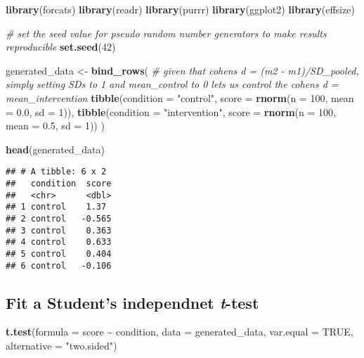 \documentclass[
]{article}
\newenvironment{Shaded}{\begin{snugshade}}{\end{snugshade}}
\newcommand{\AttributeTok}[1]{\textcolor[rgb]{0.13,0.29,0.53}{#1}}
\newcommand{\CommentTok}[1]{\textcolor[rgb]{0.56,0.35,0.01}{\textit{#1}}}
\newcommand{\ConstantTok}[1]{\textcolor[rgb]{0.56,0.35,0.01}{#1}}
\newcommand{\DecValTok}[1]{\textcolor[rgb]{0.00,0.00,0.81}{#1}}
\newcommand{\FloatTok}[1]{\textcolor[rgb]{0.00,0.00,0.81}{#1}}
\newcommand{\FunctionTok}[1]{\textcolor[rgb]{0.13,0.29,0.53}{\textbf{#1}}}
\newcommand{\NormalTok}[1]{#1}
\newcommand{\OtherTok}[1]{\textcolor[rgb]{0.56,0.35,0.01}{#1}}
\newcommand{\SpecialCharTok}[1]{\textcolor[rgb]{0.81,0.36,0.00}{\textbf{#1}}}
\newcommand{\StringTok}[1]{\textcolor[rgb]{0.31,0.60,0.02}{#1}}
\begin{document}
\begin{Shaded}
\begin{Highlighting}[]
\FunctionTok{library}\NormalTok{(forcats)}
\FunctionTok{library}\NormalTok{(readr)}
\FunctionTok{library}\NormalTok{(purrr) }
\FunctionTok{library}\NormalTok{(ggplot2)}
\FunctionTok{library}\NormalTok{(effsize)}

\CommentTok{\# set the seed value for pseudo random number generators to make results reproducible  }
\FunctionTok{set.seed}\NormalTok{(}\DecValTok{42}\NormalTok{)}

\NormalTok{generated\_data }\OtherTok{\textless{}{-}} 
  \FunctionTok{bind\_rows}\NormalTok{(}
    \CommentTok{\# given that cohen\textquotesingle{}s d = (m2 {-} m1)/SD\_pooled, simply setting SDs to 1 and mean\_control to 0 lets us control the cohen\textquotesingle{}s d = mean\_intervention}
    \FunctionTok{tibble}\NormalTok{(}\AttributeTok{condition =} \StringTok{"control"}\NormalTok{,}
           \AttributeTok{score =} \FunctionTok{rnorm}\NormalTok{(}\AttributeTok{n =} \DecValTok{100}\NormalTok{, }\AttributeTok{mean =} \FloatTok{0.0}\NormalTok{, }\AttributeTok{sd =} \DecValTok{1}\NormalTok{)), }
    \FunctionTok{tibble}\NormalTok{(}\AttributeTok{condition =} \StringTok{"intervention"}\NormalTok{,}
           \AttributeTok{score =} \FunctionTok{rnorm}\NormalTok{(}\AttributeTok{n =} \DecValTok{100}\NormalTok{, }\AttributeTok{mean =} \FloatTok{0.5}\NormalTok{, }\AttributeTok{sd =} \DecValTok{1}\NormalTok{))}
\NormalTok{  )}

\FunctionTok{head}\NormalTok{(generated\_data)}
\end{Highlighting}
\end{Shaded}

\begin{verbatim}
## # A tibble: 6 x 2
##   condition  score
##   <chr>      <dbl>
## 1 control    1.37 
## 2 control   -0.565
## 3 control    0.363
## 4 control    0.633
## 5 control    0.404
## 6 control   -0.106
\end{verbatim}

\hypertarget{fit-a-students-independnet-t-test}{%
\subsection{\texorpdfstring{Fit a Student's independnet
\emph{t}-test}{Fit a Student's independnet t-test}}\label{fit-a-students-independnet-t-test}}

\begin{Shaded}
\begin{Highlighting}[]
\FunctionTok{t.test}\NormalTok{(}\AttributeTok{formula =}\NormalTok{ score }\SpecialCharTok{\textasciitilde{}}\NormalTok{ condition, }
       \AttributeTok{data =}\NormalTok{ generated\_data,}
       \AttributeTok{var.equal =} \ConstantTok{TRUE}\NormalTok{,}
       \AttributeTok{alternative =} \StringTok{"two.sided"}\NormalTok{)}
\end{Highlighting}
\end{Shaded}
\end{document}
